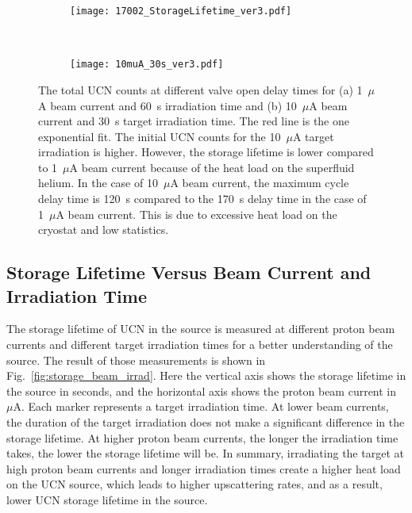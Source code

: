 \begin{figure}[h!]
  \centering
  \begin{subfigure}{.8\textwidth}
    \centering
    \texttt{[image: 17002\_StorageLifetime\_ver3.pdf]}
    \caption{}
    \label{fig:storage_example1}
  \end{subfigure}%
  \\
  \begin{subfigure}{.8\textwidth}
    \centering
    \texttt{[image: 10muA\_30s\_ver3.pdf]}
    \caption{}
    \label{fig:storage_example10}
  \end{subfigure}
  \caption[UCN storage lifetime extraction for two beam currents]{The
    total UCN counts at different valve open delay times for (a)
    1~$\mu$A beam current and 60~s irradiation time and (b) 10~$\mu$A
    beam current and 30~s target irradiation time. The red line is the
    one exponential fit. The initial UCN counts for the 10~$\mu$A
    target irradiation is higher. However, the storage lifetime is
    lower compared to 1~$\mu$A beam current because of the heat load
    on the superfluid helium. In the case of 10~$\mu$A beam current,
    the maximum cycle delay time is 120~s compared to the 170~s delay
    time in the case of 1~$\mu$A beam current. This is due to
    excessive heat load on the cryostat and low statistics.}
  \label{fig:storage_example}
\end{figure}


\subsection{Storage Lifetime Versus Beam Current and Irradiation Time}
The storage lifetime of UCN in the source is measured at different
proton beam currents and different target irradiation times for a
better understanding of the source. The result of those measurements
is shown in Fig.~\ref{fig:storage_beam_irrad}. Here the vertical axis
shows the storage lifetime in the source in seconds, and the
horizontal axis shows the proton beam current in $\mu$A. Each marker
represents a target irradiation time. At lower beam currents, the
duration of the target irradiation does not make a significant
difference in the storage lifetime. At higher proton beam currents,
the longer the irradiation time takes, the lower the storage lifetime
will be. In summary, irradiating the target at high proton beam
currents and longer irradiation times create a higher heat load on the
UCN source, which leads to higher upscattering rates, and as a result,
lower UCN storage lifetime in the source.

